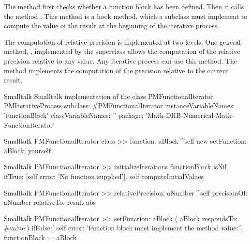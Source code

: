 The method  first checks whether a
function block has been defined. Then it calls the method . This method is a hook method, which a
subclass must implement to compute the value of the result at the
beginning of the iterative process.

The computation of relative precision is implemented at two
levels. One general method, ,
implemented by the superclass allows the computation of the
relative precision relative to any value. Any iterative process
can use this method. The method  implements
the computation of the precision relative to the current result.

\begin{listing}[label=lst:iterrel]{Smalltalk}
{Smalltalk implementation of the class PMFunctionalIterator}
PMIterativeProcess subclass: #PMFunctionalIterator
   instanceVariableNames: 'functionBlock'
   classVariableNames: ''
   package: 'Math-DHB-Numerical-Math-FunctionIterator'
\end{listing}

\begin{displaycode}{Smalltalk}
PMFunctionalIterator class >> function: aBlock
    ^self new setFunction: aBlock; yourself
\end{displaycode}

\begin{displaycode}{Smalltalk}
PMFunctionalIterator >> initializeIterations
    functionBlock isNil ifTrue: [self error: 'No function supplied'].
    self computeInitialValues
\end{displaycode}

\begin{displaycode}{Smalltalk}
PMFunctionalIterator >> relativePrecision: aNumber
    ^self precisionOf: aNumber relativeTo: result abs
\end{displaycode}

\begin{displaycode}{Smalltalk}
PMFunctionalIterator >> setFunction: aBlock
    ( aBlock respondsTo: #value:)
        ifFalse:[ self error: 'Function block must implement the 
                                                      method value:'].
    functionBlock := aBlock
\end{displaycode}

